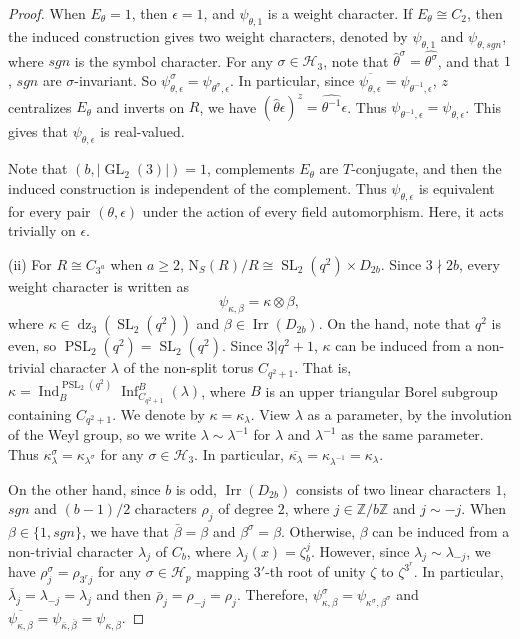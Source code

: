 \documentclass[11pt,a4paper]{article}
\numberwithin{equation}{section}
\theoremstyle{definition}
\theoremstyle{remark}
\newcommand{\Irr}{\operatorname{Irr}}
\newcommand{\GL}{\operatorname{GL}}
\newcommand{\SL}{\operatorname{SL}}
\DeclareMathOperator{\PSL}{PSL}
\newcommand{\dz}{\operatorname{dz}}
\newcommand{\Inf}{\operatorname{Inf}}
\newcommand{\HH}{\mathcal H}
\newcommand{\NN}{\mathrm N}
\newcommand{\Ind}{\operatorname{Ind}}
\begin{document}
\begin{proof}
When $E_\theta=1$, then $\epsilon=1$, and $\psi_{\theta,1}$ is a weight character. If $E_\theta\cong C_2$, then the induced construction gives two weight characters, denoted by $\psi_{\theta,1}$ and $\psi_{\theta, sgn}$, where $sgn$ is
the symbol character. For any $\sigma\in\HH_3$, note that $\widehat\theta^\sigma=\widehat{\theta^\sigma}$, and that $1$, $sgn$ are $\sigma$-invariant. So $\psi_{\theta,\epsilon}^\sigma=\psi_{\theta^\sigma,\epsilon}$.
In particular, since $\overline{\psi_{\theta,\epsilon}}=\psi_{\theta^{-1},\epsilon}$, \(z\) centralizes \(E_\theta\) and inverts on \(R\), we have $(\widehat\theta\epsilon)^z=\widehat{\theta^{-1}}\epsilon$. 
Thus  $\psi_{\theta^{-1},\epsilon}=\psi_{\theta,\epsilon}$. 
This gives that $\psi_{\theta,\epsilon}$ is real-valued. 

Note that $(b,|\GL_2(3)|)=1$, complements $E_\theta$ are $T$-conjugate, and then the induced construction is independent of the complement. Thus $\psi_{\theta,\epsilon}$ is equivalent for every pair $(\theta,\epsilon)$ under the action of every field automorphism. Here, it acts trivially on $\epsilon$.

(ii) For $R\cong C_{3^a}$ when $a\geq2$,
$\NN_S(R)/R\cong \SL_2(q^2)\times D_{2b}$. 
Since $3\nmid 2b$, every weight character is written as
\begin{equation}
\psi_{\kappa,\beta}=\kappa\otimes \beta,    
\end{equation}
where $\kappa\in\dz_3(\SL_2(q^2))$ and $\beta\in\Irr(D_{2b})$.
On the hand, note that $q^2$ is even, so $\PSL_2(q^2)=\SL_2(q^2)$. Since $3|q^2+1$, $\kappa$ can be induced from  a non-trivial character $\lambda$ of the non-split torus $C_{q^2+1}$. That is, $\kappa=\Ind_B^{\PSL_2(q^2)}\Inf_{C_{q^2+1}}^B(\lambda)$,
where $B$ is an upper triangular Borel subgroup containing $C_{q^2+1}$. We denote by $\kappa=\kappa_\lambda$.  View $\lambda$ as a parameter, by the involution of the Weyl group, so we write $\lambda\sim\lambda^{-1}$ for $\lambda$ and $\lambda^{-1}$ as the same parameter. 
Thus  $\kappa_\lambda^\sigma=\kappa_{\lambda^\sigma}$ for any $\sigma\in\HH_3$. In particular, $\overline{\kappa_\lambda}=\kappa_{\lambda^{-1}}=\kappa_{\lambda}$. 

On the other hand, since \(b\) is odd, $\Irr(D_{2b})$ consists of two linear characters $1$, $sgn$ and $(b-1)/2$ characters $\rho_j$ of degree \(2\), where $j\in {\mathbb Z}/b{\mathbb Z}$ and $j\sim-j$. When $\beta\in\{1,sgn\}$, we have that $\bar \beta=\beta$ and $\beta^\sigma=\beta$. Otherwise, $\beta$ can be induced from a non-trivial character $\lambda_j$ of  $C_{b}$, where $\lambda_j(x)=\zeta_b^j$. However, since $\lambda_j\sim\lambda_{-j}$, we have
$\rho_j^\sigma=\rho_{3^rj}$ for any 
$\sigma\in\HH_p$ mapping $3'$-th root of unity $\zeta$ to $\zeta^{3^r}$. In particular, $\bar{\lambda}_j=\lambda_{-j}=\lambda_j$ and then $\bar \rho_j=\rho_{-j}=\rho_j$. 
Therefore, $\psi_{\kappa,\beta}^\sigma=\psi_{\kappa^\sigma,\beta^\sigma}$
and 
$\overline{\psi_{\kappa,\beta}}=\psi_{\bar{\kappa},\bar{\beta}}=\psi_{\kappa,\beta}$. 


\end{proof}
\end{document}
